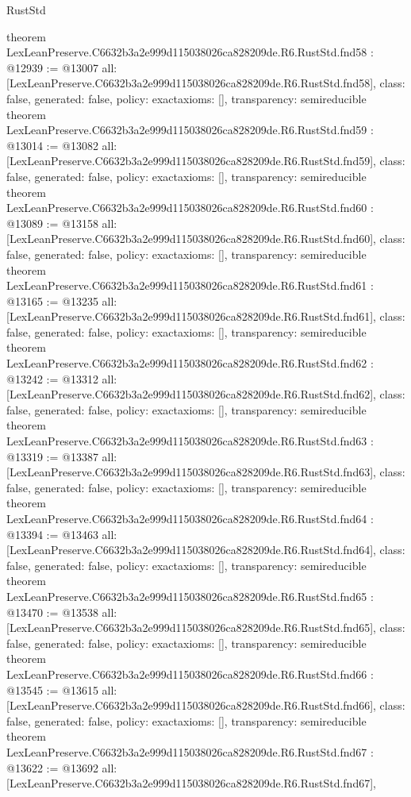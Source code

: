 \begin{lexlean}{RustStd}
\begin{coremodule}
{}
theorem LexLeanPreserve.C6632b3a2e999d115038026ca828209de.R6.RustStd.fnd58 : @12939 := @13007 {
  all: [LexLeanPreserve.C6632b3a2e999d115038026ca828209de.R6.RustStd.fnd58],
  class: false,
  generated: false,
  policy: exact{axioms: []},
  transparency: semireducible
}
theorem LexLeanPreserve.C6632b3a2e999d115038026ca828209de.R6.RustStd.fnd59 : @13014 := @13082 {
  all: [LexLeanPreserve.C6632b3a2e999d115038026ca828209de.R6.RustStd.fnd59],
  class: false,
  generated: false,
  policy: exact{axioms: []},
  transparency: semireducible
}
theorem LexLeanPreserve.C6632b3a2e999d115038026ca828209de.R6.RustStd.fnd60 : @13089 := @13158 {
  all: [LexLeanPreserve.C6632b3a2e999d115038026ca828209de.R6.RustStd.fnd60],
  class: false,
  generated: false,
  policy: exact{axioms: []},
  transparency: semireducible
}
theorem LexLeanPreserve.C6632b3a2e999d115038026ca828209de.R6.RustStd.fnd61 : @13165 := @13235 {
  all: [LexLeanPreserve.C6632b3a2e999d115038026ca828209de.R6.RustStd.fnd61],
  class: false,
  generated: false,
  policy: exact{axioms: []},
  transparency: semireducible
}
theorem LexLeanPreserve.C6632b3a2e999d115038026ca828209de.R6.RustStd.fnd62 : @13242 := @13312 {
  all: [LexLeanPreserve.C6632b3a2e999d115038026ca828209de.R6.RustStd.fnd62],
  class: false,
  generated: false,
  policy: exact{axioms: []},
  transparency: semireducible
}
theorem LexLeanPreserve.C6632b3a2e999d115038026ca828209de.R6.RustStd.fnd63 : @13319 := @13387 {
  all: [LexLeanPreserve.C6632b3a2e999d115038026ca828209de.R6.RustStd.fnd63],
  class: false,
  generated: false,
  policy: exact{axioms: []},
  transparency: semireducible
}
theorem LexLeanPreserve.C6632b3a2e999d115038026ca828209de.R6.RustStd.fnd64 : @13394 := @13463 {
  all: [LexLeanPreserve.C6632b3a2e999d115038026ca828209de.R6.RustStd.fnd64],
  class: false,
  generated: false,
  policy: exact{axioms: []},
  transparency: semireducible
}
theorem LexLeanPreserve.C6632b3a2e999d115038026ca828209de.R6.RustStd.fnd65 : @13470 := @13538 {
  all: [LexLeanPreserve.C6632b3a2e999d115038026ca828209de.R6.RustStd.fnd65],
  class: false,
  generated: false,
  policy: exact{axioms: []},
  transparency: semireducible
}
theorem LexLeanPreserve.C6632b3a2e999d115038026ca828209de.R6.RustStd.fnd66 : @13545 := @13615 {
  all: [LexLeanPreserve.C6632b3a2e999d115038026ca828209de.R6.RustStd.fnd66],
  class: false,
  generated: false,
  policy: exact{axioms: []},
  transparency: semireducible
}
theorem LexLeanPreserve.C6632b3a2e999d115038026ca828209de.R6.RustStd.fnd67 : @13622 := @13692 {
  all: [LexLeanPreserve.C6632b3a2e999d115038026ca828209de.R6.RustStd.fnd67],
}
\end{coremodule}
\end{lexlean}
